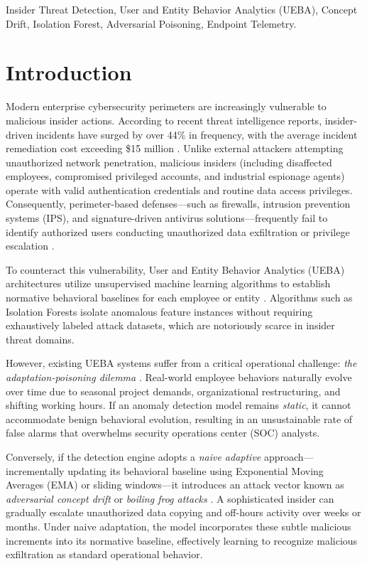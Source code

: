 \documentclass[conference]{IEEEtran}
\begin{document}
\begin{IEEEkeywords}
Insider Threat Detection, User and Entity Behavior Analytics (UEBA), Concept Drift, Isolation Forest, Adversarial Poisoning, Endpoint Telemetry.
\end{IEEEkeywords}

\section{Introduction}
Modern enterprise cybersecurity perimeters are increasingly vulnerable to malicious insider actions. According to recent threat intelligence reports, insider-driven incidents have surged by over 44\% in frequency, with the average incident remediation cost exceeding \$15 million \cite{b1}. Unlike external attackers attempting unauthorized network penetration, malicious insiders (including disaffected employees, compromised privileged accounts, and industrial espionage agents) operate with valid authentication credentials and routine data access privileges. Consequently, perimeter-based defenses—such as firewalls, intrusion prevention systems (IPS), and signature-driven antivirus solutions—frequently fail to identify authorized users conducting unauthorized data exfiltration or privilege escalation \cite{b2}.

To counteract this vulnerability, User and Entity Behavior Analytics (UEBA) architectures utilize unsupervised machine learning algorithms to establish normative behavioral baselines for each employee or entity \cite{b3}. Algorithms such as Isolation Forests \cite{b4} isolate anomalous feature instances without requiring exhaustively labeled attack datasets, which are notoriously scarce in insider threat domains.

However, existing UEBA systems suffer from a critical operational challenge: \textit{the adaptation-poisoning dilemma} \cite{b5}. Real-world employee behaviors naturally evolve over time due to seasonal project demands, organizational restructuring, and shifting working hours. If an anomaly detection model remains \textit{static}, it cannot accommodate benign behavioral evolution, resulting in an unsustainable rate of false alarms that overwhelms security operations center (SOC) analysts. 

Conversely, if the detection engine adopts a \textit{naive adaptive} approach—incrementally updating its behavioral baseline using Exponential Moving Averages (EMA) or sliding windows—it introduces an attack vector known as \textit{adversarial concept drift} or \textit{boiling frog attacks} \cite{b6}. A sophisticated insider can gradually escalate unauthorized data copying and off-hours activity over weeks or months. Under naive adaptation, the model incorporates these subtle malicious increments into its normative baseline, effectively learning to recognize malicious exfiltration as standard operational behavior.
\end{document}
